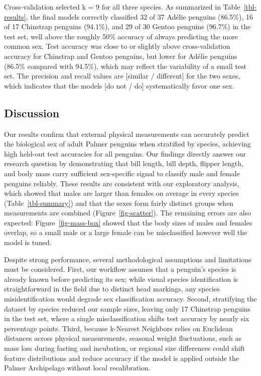 \documentclass[
  letterpaper,
  DIV=11,
  numbers=noendperiod]{scrartcl}
\begin{document}
Cross-validation selected k = 9 for all three species. As summarized in
Table~\ref{tbl-results}, the final models correctly classified 32 of 37
Adélie penguins (86.5\%), 16 of 17 Chinstrap penguins (94.1\%), and 29
of 30 Gentoo penguins (96.7\%) in the test set, well above the roughly
50\% accuracy of always predicting the more common sex. Test accuracy
was close to or slightly above cross-validation accuracy for Chinstrap
and Gentoo penguins, but lower for Adélie penguins (86.5\% compared with
94.5\%), which may reflect the variability of a small test set. The
precision and recall values are {[}similar / different{]} for the two
sexes, which indicates that the models {[}do not / do{]} systematically
favor one sex.

\subsection{Discussion}\label{discussion}

Our results confirm that external physical measurements can accurately
predict the biological sex of adult Palmer penguins when stratified by
species, achieving high held-out test accuracies for all penguins. Our
findings directly answer our research question by demonstrating that
bill length, bill depth, flipper length, and body mass carry sufficient
sex-specific signal to classify male and female penguins reliably. These
results are consistent with our exploratory analysis, which showed that
males are larger than females on average in every species
(Table~\ref{tbl-summary}) and that the sexes form fairly distinct groups
when measurements are combined (Figure~\ref{fig-scatter}). The remaining
errors are also expected: Figure~\ref{fig-mass-box} showed that the body
sizes of males and females overlap, so a small male or a large female
can be misclassified however well the model is tuned.

Despite strong performance, several methodological assumptions and
limitations must be considered. First, our workflow assumes that a
penguin's species is already known before predicting its sex; while
visual species identification is straightforward in the field due to
distinct head markings, any species misidentification would degrade sex
classification accuracy. Second, stratifying the dataset by species
reduced our sample sizes, leaving only 17 Chinstrap penguins in the test
set, where a single misclassification shifts test accuracy by nearly six
percentage points. Third, because k-Nearest Neighbors relies on
Euclidean distances across physical measurements, seasonal weight
fluctuations, such as mass loss during fasting and incubation, or
regional size differences could shift feature distributions and reduce
accuracy if the model is applied outside the Palmer Archipelago without
local recalibration.
\end{document}
